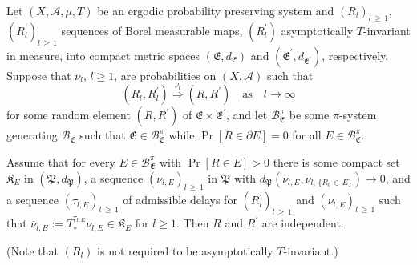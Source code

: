 \documentclass[AHL,Unicode,longabstracts]{cedram}
\newcommand{\clA}{\mathcal{A}}
\newcommand{\clB}{\mathcal{B}}
\newcommand{\frkK}{\mathfrak{K}}
\newcommand{\frkP}{\mathfrak{P}}
\newcommand{\frkE}{\mathfrak{E}}
\begin{document}
\begin{theo}\label{T_AsyIndepForAsyInvarSequences}
Let $(X,\clA,\mu,T)$ be an ergodic probability preserving system and $(R_{l})_{l\,\geq\,1}$, $(R_{l}^{\prime })_{l\,\geq\,1}$ sequences of Borel measurable maps, $(R_{l}^{\prime})$ asymptotically $T$-invariant in measure, into compact metric spaces $(\frkE,d_{\frkE})$ and $(\frkE^{\prime},d_{\frkE ^{\prime}})$, respectively. Suppose that $\nu_{l}$, $l\geq1$, are probabilities on $(X,\clA)$ such that
\begin{equation}
\left(R_{l},R_{l}^{\prime}\right)\overset{\nu_{l}}{\Longrightarrow}\left(R,R^{\prime}\right)\quad\text{as}\quad l\rightarrow\infty
\end{equation}
for some random element $(R,R^{\prime})$ of $\frkE\times\frkE^{\prime}$, and let $\clB_{\frkE}^{\pi}$ be some $\pi$-system generating $\clB_{\frkE}$ such that $\frkE\in
\clB_{\frkE}^{\pi}$ while $\Pr[R\in\partial E]=0$ for all $E\in\clB_{\frkE}^{\pi}$.

Assume that for every $E\in\clB_{\frkE}^{\pi}$ with $\Pr[R\in E]>0$ there is some compact set $\frkK_{E}$ in $(\frkP,d_{\frkP})$, a sequence $(\nu_{l,E})_{l\,\geq\,1}$ in $\frkP$ with $d_{\frkP}(\nu_{l,E},\nu_{l,\,\{R_{l}\,\in\,E\}})\rightarrow0$, and a sequence $(\tau_{l,E})_{l\,\geq\,1}$ of admissible delays for $(R_{l}^{\prime })_{l\,\geq\,1}$ and $(\nu_{l,E})_{l\,\geq\,1}$ such that $\overline{\nu} _{l,E}:=T_{\ast}^{\tau_{l,E}}\nu_{l,E}\in\frkK_{E}$ for $l\geq1$. Then $R$ and $R^{\prime}$ are independent.
\end{theo}

(Note that $(R_{l})$ is not required to be asymptotically $T$-invariant.)
\end{document}
